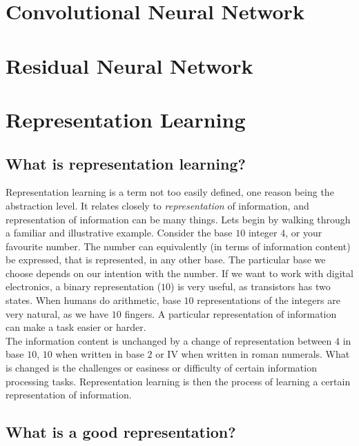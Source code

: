 \documentclass[../../thesis.tex]{subfiles}
\begin{document}
\section{Convolutional Neural Network}



\section{Residual Neural Network}


\section{Representation Learning}


\subsection*{What is representation learning?}
Representation learning is a term not too easily defined, one reason being the abstraction level. It relates closely to \textit{representation} of information, and representation of information can be many things. Lets begin by walking through a familiar and illustrative example. Consider the base $10$ integer $4$, or your favourite number. The number can equivalently (in terms of information content) be expressed, that is represented, in any other base. The particular base we choose depends on our intention with the number. If we want to work with digital electronics, a binary representation ($10$) is very useful, as transistors has two states. When humans do arithmetic, base $10$ representations of the integers are very natural, as we have $10$ fingers. A particular representation of information can make a task easier or harder.
\\
The information content is unchanged by a change of representation between $4$ in base $10$, $10$ when written in base $2$ or \RN{4} when written in roman numerals. What is changed is the challenges or easiness or difficulty of certain information processing tasks. Representation learning is then the process of learning a certain representation of information. 

\subsection*{What is a good representation?}
\end{document}
